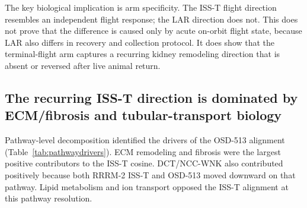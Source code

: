 \documentclass[11pt]{article}
\begin{document}
\begin{table}[h]
\centering\small
{}
\caption{Cross-OSDR pathway-vector alignment. OSD-513 is treated as directional recurrence. OSD-253 is treated as context sensitivity because of control-definition caveats.}
\label{tab:crossosdr}
\end{table}

The key biological implication is arm specificity. The ISS-T flight direction resembles an independent flight response; the LAR direction does not. This does not prove that the difference is caused only by acute on-orbit flight state, because LAR also differs in recovery and collection protocol. It does show that the terminal-flight arm captures a recurring kidney remodeling direction that is absent or reversed after live animal return.

\subsection{The recurring ISS-T direction is dominated by ECM/fibrosis and tubular-transport biology}

Pathway-level decomposition identified the drivers of the OSD-513 alignment (Table~\ref{tab:pathwaydrivers}). ECM remodeling and fibrosis were the largest positive contributors to the ISS-T cosine. DCT/NCC-WNK also contributed positively because both RRRM-2 ISS-T and OSD-513 moved downward on that pathway. Lipid metabolism and ion transport opposed the ISS-T alignment at this pathway resolution.
\end{document}
